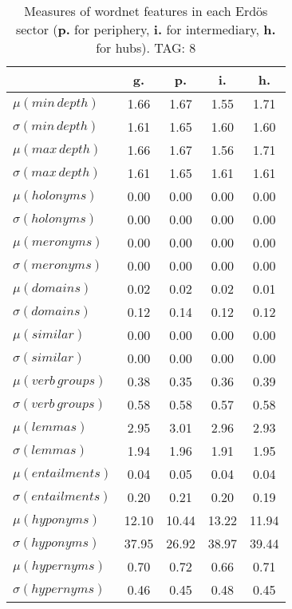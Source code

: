 \begin{table}[h!]
\begin{center}
\begin{tabular}{| l | c | c | c | c |}\hline
 & g. & p. & i. & h. \\\hline
$\mu(min\,depth)$ & 1.66  & 1.67  & 1.55  & 1.71 \\\hline
$\sigma(min\,depth)$ & 1.61  & 1.65  & 1.60  & 1.60 \\\hline
$\mu(max\,depth)$ & 1.66  & 1.67  & 1.56  & 1.71 \\\hline
$\sigma(max\,depth)$ & 1.61  & 1.65  & 1.61  & 1.61 \\\hline
$\mu(holonyms)$ & 0.00  & 0.00  & 0.00  & 0.00 \\\hline
$\sigma(holonyms)$ & 0.00  & 0.00  & 0.00  & 0.00 \\\hline
$\mu(meronyms)$ & 0.00  & 0.00  & 0.00  & 0.00 \\\hline
$\sigma(meronyms)$ & 0.00  & 0.00  & 0.00  & 0.00 \\\hline
$\mu(domains)$ & 0.02  & 0.02  & 0.02  & 0.01 \\\hline
$\sigma(domains)$ & 0.12  & 0.14  & 0.12  & 0.12 \\\hline
$\mu(similar)$ & 0.00  & 0.00  & 0.00  & 0.00 \\\hline
$\sigma(similar)$ & 0.00  & 0.00  & 0.00  & 0.00 \\\hline
$\mu(verb\,groups)$ & 0.38  & 0.35  & 0.36  & 0.39 \\\hline
$\sigma(verb\,groups)$ & 0.58  & 0.58  & 0.57  & 0.58 \\\hline
$\mu(lemmas)$ & 2.95  & 3.01  & 2.96  & 2.93 \\\hline
$\sigma(lemmas)$ & 1.94  & 1.96  & 1.91  & 1.95 \\\hline
$\mu(entailments)$ & 0.04  & 0.05  & 0.04  & 0.04 \\\hline
$\sigma(entailments)$ & 0.20  & 0.21  & 0.20  & 0.19 \\\hline
$\mu(hyponyms)$ & 12.10  & 10.44  & 13.22  & 11.94 \\\hline
$\sigma(hyponyms)$ & 37.95  & 26.92  & 38.97  & 39.44 \\\hline
$\mu(hypernyms)$ & 0.70  & 0.72  & 0.66  & 0.71 \\\hline
$\sigma(hypernyms)$ & 0.46  & 0.45  & 0.48  & 0.45 \\\hline
\end{tabular}
\caption{Measures of wordnet features in each Erd\"os sector ({{\bf p.}} for periphery, {{\bf i.}} for intermediary, {{\bf h.}} for hubs). TAG: 8}
\end{center}
\end{table}